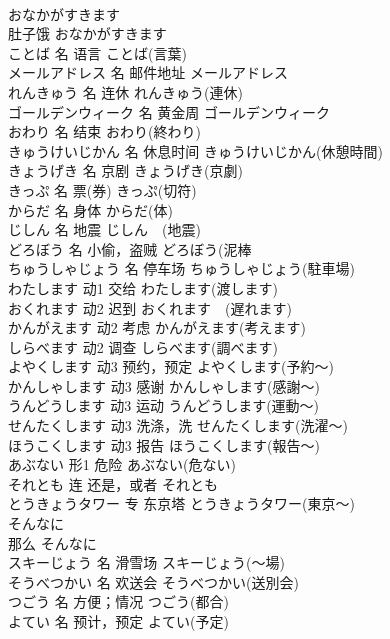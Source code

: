 \documentclass[8pt]{extreport}
\begin{document}
\begin{CJK}{UTF8}{min}
\\	おなかがすきます	
\\	肚子饿	おなかがすきます	
\\	ことば	名	语言	ことば(言葉)	
\\	メールアドレス	名	邮件地址	メールアドレス	
\\	れんきゅう	名	连休	れんきゅう(連休)	
\\	ゴールデンウィーク	名	黄金周	ゴールデンウィーク	
\\	おわり	名	结束	おわり(終わり)	
\\	きゅうけいじかん	名	休息时间	きゅうけいじかん(休憩時間)	
\\	きょうげき	名	京剧	きょうげき(京劇)	
\\	きっぷ	名	票(券)	きっぷ(切符)	
\\	からだ	名	身体	からだ(体)	
\\	じしん	名	地震	じしん　(地震)	
\\	どろぼう	名	小偷，盗贼	どろぼう(泥棒　
\\	ちゅうしゃじょう	名	停车场	ちゅうしゃじょう(駐車場)	
\\	わたします	动1	交给	わたします(渡します)	
\\	おくれます	动2	迟到	おくれます　(遅れます)	
\\	かんがえます	动2	考虑	かんがえます(考えます)	
\\	しらべます	动2	调查	しらべます(調べます)	
\\	よやくします	动3	预约，预定	よやくします(予約～)	
\\	かんしゃします	动3	感谢	かんしゃします(感謝～)	
\\	うんどうします	动3	运动	うんどうします(運動～)	
\\	せんたくします	动3	洗涤，洗	せんたくします(洗濯～)	
\\	ほうこくします	动3	报告	ほうこくします(報告～)	
\\	あぶない	形1	危险	あぶない(危ない)	
\\	それとも	连	还是，或者	それとも	
\\	とうきょうタワー	专	东京塔	とうきょうタワー(東京～)	
\\	そんなに	
\\	那么	そんなに	
\\	スキーじょう	名	滑雪场	スキーじょう(～場)	
\\	そうべつかい	名	欢送会	そうべつかい(送別会)	
\\	つごう	名	方便；情况	つごう(都合)	
\\	よてい	名	预计，预定	よてい(予定)	

\end{CJK}
\end{document}
